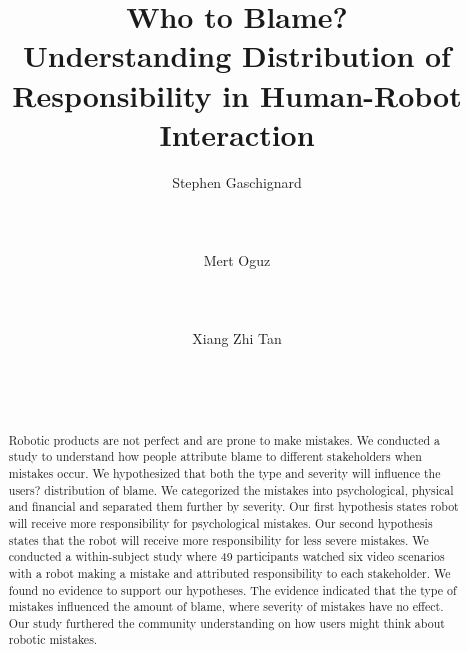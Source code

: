 \documentclass{sigchi}
\begin{document}
\title{Who to Blame?\\ Understanding Distribution of Responsibility in Human-Robot Interaction}

\author{
  \alignauthor  Stephen Gaschignard\\
    \\
    \\
    \\
  \alignauthor Mert Oguz\\
    \\
    \\
    \\    
  \alignauthor Xiang Zhi Tan\\
    \\
    \\
    \\
}

\maketitle

\begin{abstract}
Robotic products are not perfect and are prone to make mistakes. We conducted a study to understand how people attribute blame to different stakeholders when mistakes occur. We hypothesized that both the type and severity will influence the users? distribution of blame. We categorized the mistakes into psychological, physical and financial and separated them further by severity. Our first hypothesis states robot will receive more responsibility for psychological mistakes. Our second hypothesis states that the robot will receive more responsibility for less severe mistakes. We conducted a within-subject study where 49 participants watched six video scenarios with a robot making a mistake and attributed responsibility to each stakeholder. We found no evidence to support our hypotheses. The evidence indicated that the type of mistakes influenced the amount of blame, where severity of mistakes have no effect. Our study furthered the community understanding on how users might think about robotic mistakes.
\end{abstract}

\end{document}
